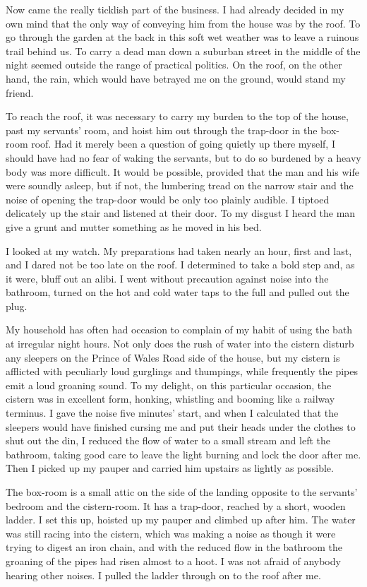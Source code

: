 Now came the really ticklish part of the business. I had already decided in my own mind that the only way of conveying him from the house was by the roof. To go through the garden at the back in this soft wet weather was to leave a ruinous trail behind us. To carry a dead man down a suburban street in the middle of the night seemed outside the range of practical politics. On the roof, on the other hand, the rain, which would have betrayed me on the ground, would stand my friend.

To reach the roof, it was necessary to carry my burden to the top of the house, past my servants’ room, and hoist him out through the trap-door in the box-room roof. Had it merely been a question of going quietly up there myself, I should have had no fear of waking the servants, but to do so burdened by a heavy body was more difficult. It would be possible, provided that the man and his wife were soundly asleep, but if not, the lumbering tread on the narrow stair and the noise of opening the trap-door would be only too plainly audible. I tiptoed delicately up the stair and listened at their door. To my disgust I heard the man give a grunt and mutter something as he moved in his bed.

I looked at my watch. My preparations had taken nearly an hour, first and last, and I dared not be too late on the roof. I determined to take a bold step and, as it were, bluff out an alibi. I went without precaution against noise into the bathroom, turned on the hot and cold water taps to the full and pulled out the plug.

My household has often had occasion to complain of my habit of using the bath at irregular night hours. Not only does the rush of water into the cistern disturb any sleepers on the Prince of Wales Road side of the house, but my cistern is afflicted with peculiarly loud gurglings and thumpings, while frequently the pipes emit a loud groaning sound. To my delight, on this particular occasion, the cistern was in excellent form, honking, whistling and booming like a railway terminus. I gave the noise five minutes’ start, and when I calculated that the sleepers would have finished cursing me and put their heads under the clothes to shut out the din, I reduced the flow of water to a small stream and left the bathroom, taking good care to leave the light burning and lock the door after me. Then I picked up my pauper and carried him upstairs as lightly as possible.

The box-room is a small attic on the side of the landing opposite to the servants’ bedroom and the cistern-room. It has a trap-door, reached by a short, wooden ladder. I set this up, hoisted up my pauper and climbed up after him. The water was still racing into the cistern, which was making a noise as though it were trying to digest an iron chain, and with the reduced flow in the bathroom the groaning of the pipes had risen almost to a hoot. I was not afraid of anybody hearing other noises. I pulled the ladder through on to the roof after me.

